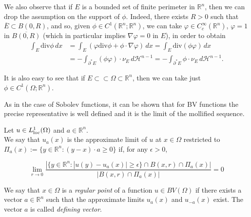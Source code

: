 \begin{remark} \label{G-G fin per bounded} We also observe that if $E$ is a bounded set of finite perimeter in $\mathbb{R}^{n}$, then we can drop the assumption on the support of $\phi$. Indeed, there exists $R > 0$ such that $\overline{E} \subset B(0, R)$, and so, given $\phi \in C^{1}(\mathbb{R}^{n}; \mathbb{R}^{n})$, we can take $\varphi \in C^{\infty}_{c}(\mathbb{R}^{n})$, $\varphi = 1$ in $\overline{B(0, R)}$ (which in particular implies $\nabla \varphi = 0$ in $E$), in order to obtain
\begin{align*} \int_{E} \mathrm{div} \phi \, dx & = \int_{E} (\varphi \mathrm{div}\phi + \phi \cdot \nabla \varphi) \, dx = \int_{E} \mathrm{div}(\phi \varphi) \, dx \\
& = - \int_{\partial^{*} E} (\phi \varphi) \cdot \nu_{E}\, d\mathcal{H}^{n-1} = - \int_{\partial^{*} E} \phi \cdot \nu_{E}\, d\mathcal{H}^{n-1}. 
\end{align*}

It is also easy to see that if $E \subset \subset \Omega \subset \mathbb{R}^{n}$, then we can take just $\phi \in C^{1}(\Omega; \mathbb{R}^{n})$.
\end{remark}

As in the case of Sobolev functions, it can be shown that for BV functions the precise representative is well defined and it is the limit of the mollified sequence.

\begin{definition} \label{approxlimrestr} Let $u \in L^{1}_{\rm loc}(\Omega)$ and $a \in \mathbb{R}^{n}$. 
\\
We say that $u_{a}(x)$ is the approximate limit of $u$ at $x \in \Omega$ restricted to $\Pi_{a}(x) := \{y \in \mathbb{R}^{n} : (y - x) \cdot a \ge 0 \}$ if, for any $\epsilon > 0$,

\[\lim_{r \to 0} \frac{|\{y \in \mathbb{R}^{n} : |u(y) - u_{a}(x)| \ge \epsilon \} \cap B(x,r) \cap \Pi_{a}(x)|}{|B(x,r) \cap \Pi_{a}(x)|} = 0 \]
\end{definition}
\begin{definition} We say that $x \in \Omega$ is a {\em regular point} of a function $u \in BV(\Omega)$ if there exists a vector $a \in \mathbb{R}^{n}$ such that the approximate limits $u_{a}(x)$ and $u_{-a}(x)$ exist. The vector $a$ is called {\em defining vector}.
\end{definition}

